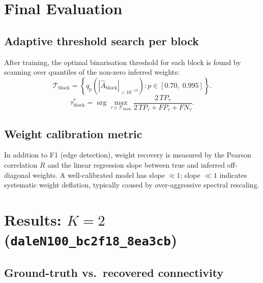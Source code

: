 \documentclass[11pt]{article}
\begin{document}
\section{Final Evaluation}

\subsection{Adaptive threshold search per block}
After training, the optimal binarisation threshold for each block is found by scanning
over quantiles of the non-zero inferred weights:
\begin{equation}
  \mathcal{T}_{\mathrm{block}} =
  \left\{q_p\!\left(|\hat A_{\mathrm{block}}|_{>10^{-12}}\right):
    p\in[0.70,\;0.995]\right\}.
\end{equation}
\begin{equation}
  \tau_{\mathrm{block}}^* = \arg\max_{\tau\in\mathcal{T}_{\mathrm{block}}}
    \frac{2\,TP_\tau}{2\,TP_\tau+FP_\tau+FN_\tau}.
\end{equation}

\subsection{Weight calibration metric}
In addition to F1 (edge detection), weight recovery is measured by the
Pearson correlation $R$ and the linear regression slope between true and inferred
off-diagonal weights.  A well-calibrated model has slope $\approx 1$; slope $\ll 1$
indicates systematic weight deflation, typically caused by over-aggressive spectral
rescaling.

\section{Results: $K=2$ (\texttt{daleN100\_bc2f18\_8ea3cb})}

\subsection{Ground-truth vs.\ recovered connectivity}
\end{document}

